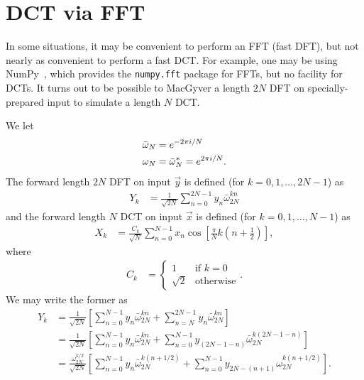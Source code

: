 \section{DCT via FFT}

In some situations, it may be convenient to perform an FFT (fast DFT), but not nearly as convenient to perform a fast DCT.
For example, one may be using NumPy~\cite{van2011numpy}, which provides the \texttt{numpy.fft} package for FFTs, but no facility for DCTs.
It turns out to be possible to MacGyver a length $2 N$ DFT on specially-prepared input to simulate a length $N$ DCT.

We let
\begin{subequations}
\begin{align}
	\bar{\omega}_N
	&= e^{-2 \pi i / N} \\
	\omega_N
	&= \bar{\omega}_N^*
	= e^{2 \pi i / N}.
\end{align}
\end{subequations}
The forward length $2 N$ DFT on input $\vec{y}$ is defined (for $k = 0, 1, \ldots, 2 N - 1$) as
\begin{align}
	Y_k
	&= \frac{1}{\sqrt{2 N}} \sum_{n=0}^{2 N - 1} y_n \bar{\omega}_{2 N}^{k n}
\end{align}
and the forward length $N$ DCT on input $\vec{x}$ is defined (for $k = 0, 1, \ldots, N - 1$) as
\begin{align}
	X_k
	&= \frac{C_k}{\sqrt{N}} \sum_{n=0}^{N - 1} x_n \cos{\left[ \frac{\pi}{N} k \left( n + \frac{1}{2} \right) \right]},
		\label{eq:dct}
\end{align}
where
\begin{align}
	C_k
	&= \begin{cases}
			1 & \text{if } k = 0 \\
			\sqrt{2} & \text{otherwise}
		\end{cases}.
\end{align}
We may write the former as
\begin{subequations}
\begin{align}
	Y_k
	&= \frac{1}{\sqrt{2 N}} \left[
			\sum_{n=0}^{N - 1} y_n \bar{\omega}_{2 N}^{k n}
			+ \sum_{n=N}^{2 N - 1} y_n \bar{\omega}_{2 N}^{k n}
		\right] \\
	&= \frac{1}{\sqrt{2 N}} \left[
			\sum_{n=0}^{N - 1} y_n \bar{\omega}_{2 N}^{k n}
			+ \sum_{n=0}^{N - 1} y_{(2 N - 1 - n)} \bar{\omega}_{2 N}^{k (2 N - 1 - n)}
		\right] \\
	&= \frac{\omega_{2 N}^{k/2}}{\sqrt{2 N}} \left[
			\sum_{n=0}^{N - 1} y_n \bar{\omega}_{2 N}^{k (n + 1/2)}
			+ \sum_{n=0}^{N - 1} y_{2 N - (n + 1)} \omega_{2 N}^{k (n + 1/2)}
		\right].
\end{align}
\end{subequations}
